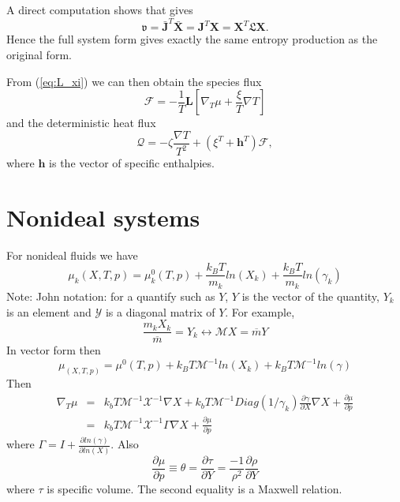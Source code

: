 \documentclass[11pt]{article}
\newcommand{\HeatFlux}{\boldsymbol{\mathcal{Q}}}
\newcommand{\SpeciesFlux}{\boldsymbol{\mathcal{F}}}
\newcommand{\EntropyProduction}{\mathfrak{v}}
\newcommand{\OnsagerMatrix}{\boldsymbol{\mathfrak{L}}}
\newcommand{\mbar}{\overline{m}}
\newcommand{\Jbar}{\bar{\mathbf{J}}}
\newcommand{\Xbar}{\bar{\mathbf{X}}}
\begin{document}
A direct computation shows that  gives
\[
\EntropyProduction
= \Jbar^T \Xbar
= {\mathbf{J}}^T {\mathbf{X}}
=  {\mathbf{X}}^T {\OnsagerMatrix} {\mathbf{X}}.
\]
Hence the full system form gives exactly the same entropy production as the original form.

From (\ref{eq:L_xi}) we can then obtain the species flux
\begin{equation}
\SpeciesFlux = -\frac{1}{T} \mathbf{L} \left [ \nabla_T \mu + \frac{\xi}{T}\nabla T \right ]
\label{eq:F_Onsager}
\end{equation}
and the deterministic heat flux
\begin{equation}
\HeatFlux
= -\zeta \frac{\nabla T}{T^2}  +
(\xi^T + \mathbf{h}^T) \SpeciesFlux,
\label{eq:Q_Onsager}
\end{equation}
where $\mathbf{h}$ is the vector of specific enthalpies.

\section{Nonideal systems}

For nonideal fluids we have
\[
\mu_k(X,T,p) = \mu_k^0(T,p) + \frac{k_B T}{m_k} ln (X_k) + \frac{k_B T}{m_k} ln (\gamma_k)
\]
Note:  John notation:  for a quantify such as $Y$, $Y$ is the vector of the quantity, $Y_k$ is an
element and $\mathcal{Y}$ is a diagonal matrix of $Y$. For example,
\[
\frac{m_k X_k}{\mbar} = Y_k \leftrightarrow \mathcal{M} X = \mbar Y
\]
In vector form then
\[
\mu_(X,T,p) = \mu^0(T,p) + {k_B T}{\mathcal{M}^{-1}} ln (X_k) + {k_B T}\mathcal{M}^{-1} ln (\gamma)
\]
Then
\begin{eqnarray}
\nabla_T \mu
&=& k_b T \mathcal{M}^{-1} \mathcal{X}^{-1} \nabla X +
 k_b T \mathcal{M}^{-1} Diag(1/\gamma_k) \frac{\partial \gamma}{\partial X} \nabla X + \frac{\partial \mu}{\partial p} \\
&=& k_b T \mathcal{M}^{-1} \mathcal{X}^{-1} \Gamma \nabla X + \frac{\partial \mu}{\partial p}
\end{eqnarray}
where $\Gamma = I + \frac{\partial ln (\gamma)}{\partial ln(X)}$.
Also
\[
\frac{\partial \mu}{\partial p} \equiv \theta = \frac{ \partial \tau}{\partial Y} =
\frac{-1}{\rho^2}\frac{\partial \rho}{\partial Y}
\]
where $\tau$ is specific volume. The second equality is a Maxwell relation.
\end{document}
